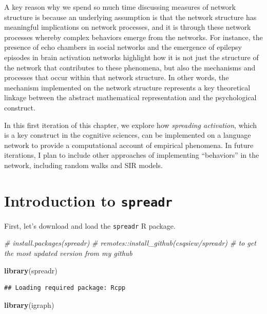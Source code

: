\documentclass[
]{book}
\newenvironment{Shaded}{\begin{snugshade}}{\end{snugshade}}
\newcommand{\CommentTok}[1]{\textcolor[rgb]{0.56,0.35,0.01}{\textit{#1}}}
\newcommand{\FunctionTok}[1]{\textcolor[rgb]{0.13,0.29,0.53}{\textbf{#1}}}
\newcommand{\NormalTok}[1]{#1}
\begin{document}
A key reason why we spend so much time discussing measures of network structure is because an underlying assumption is that the network structure has meaningful implications on network processes, and it is through these network processes whereby complex behaviors emerge from the networks. For instance, the presence of echo chambers in social networks and the emergence of epilepsy episodes in brain activation networks highlight how it is not just the structure of the network that contributes to these phenomena, but also the mechanisms and processes that occur within that network structure. In other words, the mechanism implemented on the network structure represents a key theoretical linkage between the abstract mathematical representation and the psychological construct.

In this first iteration of this chapter, we explore how \emph{spreading activation}, which is a key construct in the cognitive sciences, can be implemented on a language network to provide a computational account of empirical phenomena. In future iterations, I plan to include other approaches of implementing ``behaviors'' in the network, including random walks and SIR models.

\section{\texorpdfstring{Introduction to \texttt{spreadr}}{Introduction to spreadr}}\label{introduction-to-spreadr}

First, let's download and load the \texttt{spreadr} R package.

\begin{Shaded}
\begin{Highlighting}[]
\CommentTok{\# install.packages(\textquotesingle{}spreadr\textquotesingle{})}
\CommentTok{\# remotes::install\_github(\textquotesingle{}csqsiew/spreadr\textquotesingle{}) \# to get the most updated version from my github }

\FunctionTok{library}\NormalTok{(spreadr)}
\end{Highlighting}
\end{Shaded}

\begin{verbatim}
## Loading required package: Rcpp
\end{verbatim}

\begin{Shaded}
\begin{Highlighting}[]
\FunctionTok{library}\NormalTok{(igraph)}
\end{Highlighting}
\end{Shaded}
\end{document}
